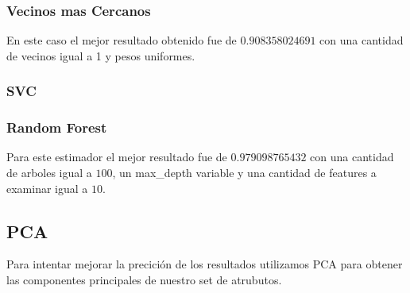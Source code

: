 \subsubsection{Vecinos mas Cercanos}


En este caso el mejor resultado obtenido fue de $0.908358024691$ con una cantidad de vecinos igual a 1 y pesos uniformes.


\subsubsection{SVC}


\subsubsection{Random Forest}


Para este estimador el mejor resultado fue de $0.979098765432$ con una cantidad de arboles igual a $100$, un max_depth variable y una cantidad de features a examinar igual a $10$.


\subsection{PCA}

Para intentar mejorar la precición de los resultados utilizamos PCA para obtener las componentes principales de nuestro set de atrubutos.